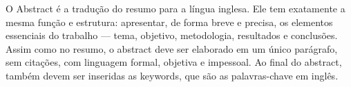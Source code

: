 O Abstract é a tradução do resumo para a língua inglesa. Ele tem exatamente a mesma função e estrutura: apresentar, de forma breve e precisa, os elementos essenciais do trabalho — tema, objetivo, metodologia, resultados e conclusões. Assim como no resumo, o abstract deve ser elaborado em um único parágrafo, sem citações, com linguagem formal, objetiva e impessoal. Ao final do abstract, também devem ser inseridas as keywords, que são as palavras-chave em inglês.